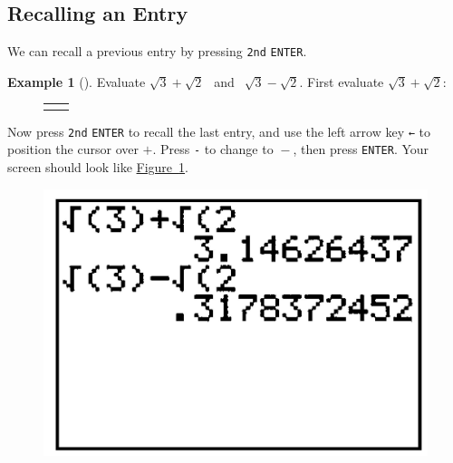 \documentclass[10pt,]{book}
\theoremstyle{plain}
\theoremstyle{definition}
\theoremstyle{definition}
\newtheorem{example}[theorem]{Example}
\theoremstyle{definition}
\numberwithin{equation}{part}
\newlength{\panelmax}
\begin{document}
\subsection[{Recalling an Entry}]{Recalling an Entry}\label{subsection-73}
We can recall a previous entry by pressing \lstinline?2nd? \lstinline?ENTER?.%
\begin{example}[]\label{example-112}
Evaluate \(\sqrt{3}+\sqrt{2}~~ \) and \(~~\sqrt{3}-\sqrt{2} \). First evaluate \(\sqrt{3}+\sqrt{2} \):%
{%
\setlength{\panelmax}{0pt}
\newsavebox{\panelboxAKHp}
\newlength{\phAKHp}\setlength{\phAKHp}{\ht\panelboxAKHp+\dp\panelboxAKHp}
\settototalheight{\phAKHp}{\usebox{\panelboxAKHp}}
\setlength{\panelmax}{\maxof{\panelmax}{\phAKHp}}
\newsavebox{\panelboxAKIp}
\newlength{\phAKIp}\setlength{\phAKIp}{\ht\panelboxAKIp+\dp\panelboxAKIp}
\settototalheight{\phAKIp}{\usebox{\panelboxAKIp}}
\setlength{\panelmax}{\maxof{\panelmax}{\phAKIp}}
\leavevmode%
\setlength{\tabcolsep}{0.025\textwidth}
\begin{figure}
\begin{tabular}{@{}*{2}{c}@{}}
\begin{minipage}[c][\panelmax][t]{0.65\textwidth}\usebox{\panelboxAKHp}\end{minipage}&
\begin{minipage}[c][\panelmax][t]{0.3\textwidth}\usebox{\panelboxAKIp}\end{minipage}\end{tabular}
\end{figure}
}%
\par
Now press \lstinline?2nd? \lstinline?ENTER? to recall the last entry, and use the left arrow key \lstinline?←? to position the cursor over \(+\). Press \lstinline?-? to change to \({}-{}\), then press \lstinline?ENTER?. Your screen should look like \hyperref[fig-GC-sum-of-roots]{Figure~\ref{fig-GC-sum-of-roots}}. \leavevmode%
\begin{figure}
\centering
\includegraphics[width=0.25\linewidth]{images/fig-GC-sum-of-roots.jpg}
\caption{\label{fig-GC-sum-of-roots}}
\end{figure}
%
\end{example}
\typeout{************************************************}
\typeout{************************************************}
\end{document}
